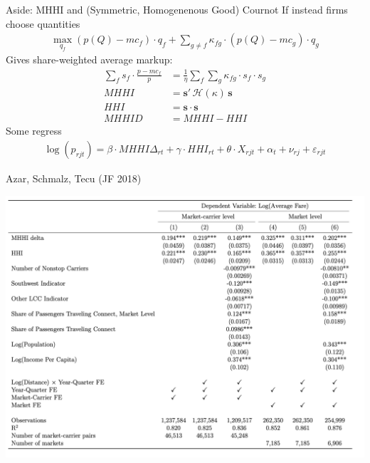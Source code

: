 \documentclass[handout, serif, aspectratio=169, 10pt]{beamer}
\begin{document}
\begin{frame}[plain,label=recoveringeta]{Aside: MHHI and (Symmetric, Homogenenous Good) Cournot}
\small
If instead firms choose quantities
 \begin{align*}
 \max_{q_f} \left (p(Q) - mc_f \right) \cdot q_f +  \sum_{g \neq f} \kappa_{fg} \cdot \left(p(Q) - mc_g \right) \cdot q_g
 \end{align*}
Gives share-weighted average markup:
\begin{align*}
\sum_f s_f \cdot \frac{p - mc_f}{p} &= \frac{1}{\eta} \sum_f \sum_g \kappa_{fg}\cdot s_f \cdot s_g \\
 MHHI &= \mathbf{s}' \, \mathcal{H}(\kappa) \, \mathbf{s}\\
 HHI &= \mathbf{s} \cdot \mathbf{s}\\
MHHID &= MHHI - HHI 
\end{align*}
Some regress
\begin{align*}
\log \left(p_{r j t}\right)=\beta \cdot M H H I \Delta_{r t}+\gamma \cdot H H I_{r t}+\theta \cdot X_{r j t}+\alpha_t+\nu_{r j}+\varepsilon_{r j t}
\end{align*}
 \end{frame}


\begin{frame}{Azar, Schmalz, Tecu (JF 2018)}

\begin{center}
\includegraphics[height=0.95\textheight]{resources/ast_1.png}
\end{center}
\end{frame}
\end{document}
